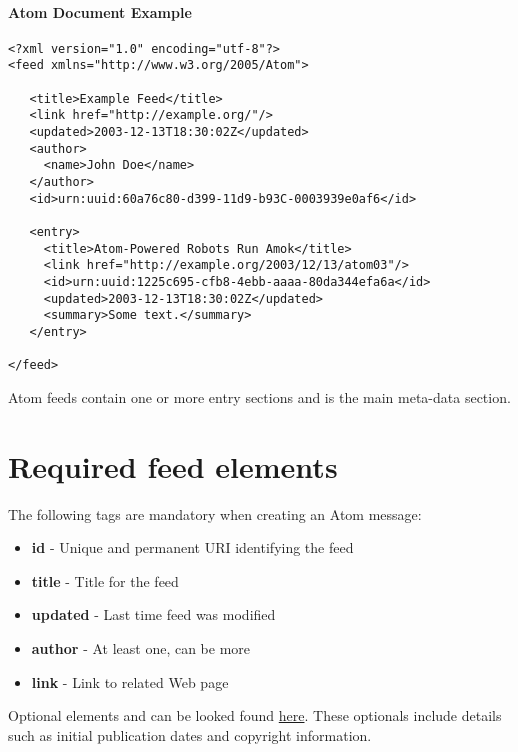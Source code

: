 \documentclass{report}
\begin{document}
\paragraph{Atom Document Example}
\begin{verbatim}
<?xml version="1.0" encoding="utf-8"?>
<feed xmlns="http://www.w3.org/2005/Atom">

   <title>Example Feed</title>
   <link href="http://example.org/"/>
   <updated>2003-12-13T18:30:02Z</updated>
   <author>
     <name>John Doe</name>
   </author>
   <id>urn:uuid:60a76c80-d399-11d9-b93C-0003939e0af6</id>

   <entry>
     <title>Atom-Powered Robots Run Amok</title>
     <link href="http://example.org/2003/12/13/atom03"/>
     <id>urn:uuid:1225c695-cfb8-4ebb-aaaa-80da344efa6a</id>
     <updated>2003-12-13T18:30:02Z</updated>
     <summary>Some text.</summary>
   </entry>

</feed>
\end{verbatim}

Atom feeds contain one or more entry sections and is the main meta-data section.

\section{Required feed elements}
The following tags are mandatory when creating an Atom message:
\begin{itemize}
  \item \textbf{id} - Unique and permanent URI identifying the feed
  \item \textbf{title} - Title for the feed
  \item \textbf{updated} - Last time feed was modified
  \item \textbf{author} - At least one, can be more
  \item \textbf{link} - Link to related Web page
\end{itemize}

Optional elements and can be looked found \href{http://www.atomenabled.org/developers/syndication/#optionalEntryElements}{here}. These optionals include details such as initial publication dates and copyright information.
\end{document}
